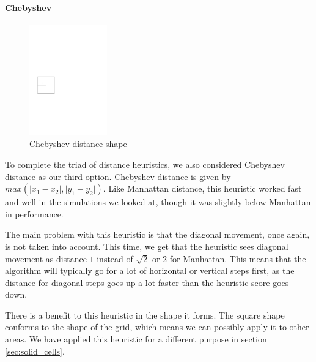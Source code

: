 \paragraph{Chebyshev}
\label{sec:chebyshev}
\begin{figure}
\includegraphics[width=0.30\textwidth]{images/chebyshev_unit.pdf}
\caption{Chebyshev distance shape}
\end{figure}
To complete the triad of distance heuristics, we also considered Chebyshev distance as our third option. Chebyshev distance is given by $max(\lvert x_1 - x_2 \rvert, \lvert y_1 - y_2 \rvert)$. Like Manhattan distance, this heuristic worked fast and well in the simulations we looked at, though it was slightly below Manhattan in performance.

The main problem with this heuristic is that the diagonal movement, once again, is not taken into account. This time, we get that the heuristic sees diagonal movement as distance $1$ instead of $\sqrt{2}$ or $2$ for Manhattan. This means that the algorithm will typically go for a lot of horizontal or vertical steps first, as the distance for diagonal steps goes up a lot faster than the heuristic score goes down.

There is a benefit to this heuristic in the shape it forms. The square shape conforms to the shape of the grid, which means we can possibly apply it to other areas. We have applied this heuristic for a different purpose in section \ref{sec:solid_cells}.

